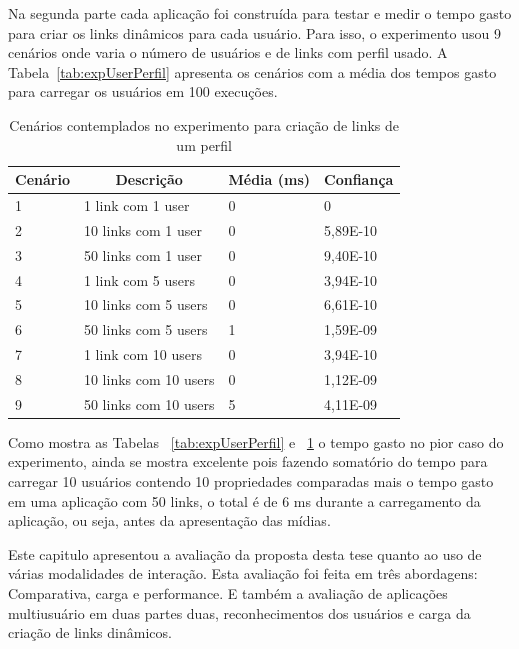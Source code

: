 Na segunda parte cada aplicação foi construída para testar e medir o tempo gasto para criar os links dinâmicos para cada usuário. Para isso, o experimento usou 9 cenários onde varia o número de usuários e de links com perfil usado. A Tabela~\ref{tab:expUserPerfil} apresenta os cenários com a média dos tempos gasto para carregar os usuários em 100 execuções.

\begin{table}[h]
\centering
{
  \renewcommand\arraystretch{1.25}
  \begin{tabular}{|p{}|p{6cm}|p{}|p{2cm}|} \hline
   \multicolumn{1}{|c|}{Cenário} & \multicolumn{1}{|c|}{Descrição} & \multicolumn{1}{c|}{Média (ms)} & \multicolumn{1}{c|}{Confiança} \\\hline
   
   1 & 1 link com 1 user & 0 & 0 \\\hline
   2 & 10 links com 1 user & 0 & 5,89E-10 \\\hline
   3 & 50 links com 1 user & 0 & 9,40E-10 \\\hline	 	
   
   4 & 1 link com 5 users & 0 & 3,94E-10 \\\hline
   5 & 10 links com 5 users & 0 & 6,61E-10 \\\hline	
   6 & 50 links com 5 users & 1 & 1,59E-09 \\\hline		

   7 & 1 link com 10 users & 0 & 3,94E-10   \\\hline
   8 & 10 links com 10 users & 0 & 1,12E-09 \\\hline	
   9 & 50 links com 10 users & 5 &  4,11E-09 \\\hline		
 
   \end{tabular}
\caption{Cenários contemplados no experimento para criação de links de um perfil}
\label{tab:expLinksPerfil}
}
\end{table}

Como mostra as Tabelas ~\ref{tab:expUserPerfil} e ~\ref{tab:expLinksPerfil} o tempo gasto no pior caso do experimento, ainda se mostra excelente pois fazendo somatório do tempo para carregar 10 usuários contendo 10 propriedades comparadas mais o tempo gasto em uma aplicação com 50 links, o total é de 6 ms durante a carregamento da aplicação, ou seja, antes da apresentação das mídias.

Este capitulo apresentou a avaliação da proposta desta tese quanto ao uso de várias modalidades de interação. Esta avaliação foi feita em três abordagens: Comparativa, carga e performance. E também a avaliação de aplicações multiusuário em duas partes duas, reconhecimentos dos usuários e carga da criação de links dinâmicos.

